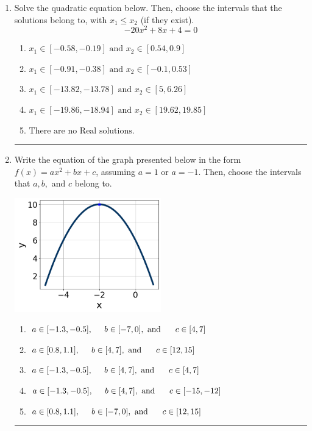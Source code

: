 \documentclass[14pt]{extbook}
\newcommand{\litem}[1]{\item#1\hspace*{-1cm}\rule{\textwidth}{0.4pt}}
\begin{document}
\begin{enumerate}
{\begin{enumerate}[label=\Alph*.]
\end{enumerate} }
\litem{
Solve the quadratic equation below. Then, choose the intervals that the solutions belong to, with $x_1 \leq x_2$ (if they exist).\[ -20x^{2} +8 x + 4 = 0 \]\begin{enumerate}[label=\Alph*.]
\item \( x_1 \in [-0.58, -0.19] \text{ and } x_2 \in [0.54, 0.9] \)
\item \( x_1 \in [-0.91, -0.38] \text{ and } x_2 \in [-0.1, 0.53] \)
\item \( x_1 \in [-13.82, -13.78] \text{ and } x_2 \in [5, 6.26] \)
\item \( x_1 \in [-19.86, -18.94] \text{ and } x_2 \in [19.62, 19.85] \)
\item \( \text{There are no Real solutions.} \)

\end{enumerate} }
\litem{
Write the equation of the graph presented below in the form $f(x)=ax^2+bx+c$, assuming  $a=1$ or $a=-1$. Then, choose the intervals that $a, b,$ and $c$ belong to.
\begin{center}
    \includegraphics[width=0.5\textwidth]{../Figures/quadraticGraphToEquationCopyA.png}
\end{center}
\begin{enumerate}[label=\Alph*.]
\item \( a \in [-1.3, -0.5], \hspace*{5mm} b \in [-7, 0], \text{ and } \hspace*{5mm} c \in [4, 7] \)
\item \( a \in [0.8, 1.1], \hspace*{5mm} b \in [4, 7], \text{ and } \hspace*{5mm} c \in [12, 15] \)
\item \( a \in [-1.3, -0.5], \hspace*{5mm} b \in [4, 7], \text{ and } \hspace*{5mm} c \in [4, 7] \)
\item \( a \in [-1.3, -0.5], \hspace*{5mm} b \in [4, 7], \text{ and } \hspace*{5mm} c \in [-15, -12] \)
\item \( a \in [0.8, 1.1], \hspace*{5mm} b \in [-7, 0], \text{ and } \hspace*{5mm} c \in [12, 15] \)


\end{enumerate}}
\end{enumerate}
\end{document}

